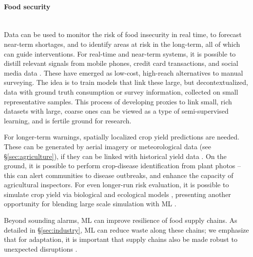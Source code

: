 \documentclass[11pt]{report}
\newcommand{\Gap}{\texorpdfstring{\hfill}{}}
\newcommand{\Rec}{\texorpdfstring{{\small\emph{\color{blue}{\fbox{High Leverage}}}}}{}}
\begin{document}
\paragraph*{Food security}\Gap\textbf{\Rec}\mbox{}\\
Data can be used to monitor the risk of food insecurity in real time, to forecast
near-term shortages, and to identify areas at risk in the long-term, all of which
can guide interventions. For real-time and near-term systems, it is
possible to distill relevant signals from mobile phones, credit card
transactions, and social media data \cite{decuyper2014estimating,
pulse2015using, kim2017nowcasting}. These have emerged as low-cost, high-reach
alternatives to manual surveying. The idea is to train models that link these
large, but decontextualized, data with ground truth consumption or survey
information, collected on small representative samples. This process of 
developing proxies to link small, rich datasets with large, coarse ones 
can be viewed as a type of semi-supervised learning, and is fertile ground
for research.

For longer-term warnings, spatially localized crop yield predictions are needed.
These can be generated by aerial imagery or meteorological data (see \S\ref{sec:agriculture}), if they can be
linked with historical yield data \cite{Chakraborty2011, wang2018deep}. 
On the ground, it is possible to perform crop-disease
identification from plant photos -- this can alert communities to disease
outbreaks, and enhance the capacity of agricultural inspectors. For even
longer-run risk evaluation, it is possible to simulate crop yield via biological
and ecological models \cite{tebaldi2008towards,rosenzweig2014assessing,konduri_kumar_hoffman_bhatia_gouthier_ganguly},
presenting another opportunity for blending large scale simulation with
ML \cite{paganini2018accelerating, welling2015ml}.

Beyond sounding alarms, ML can improve resilience of food supply chains. As
detailed in \S\ref{sec:industry}, ML can reduce waste along these chains;
we emphasize that for adaptation, it is important that supply chains also be made
robust to unexpected disruptions \cite{rancourt2015tactical,
prasad_vuyyuru_gupta, drivendata_supply, mwebaze2010causal}.
\end{document}
